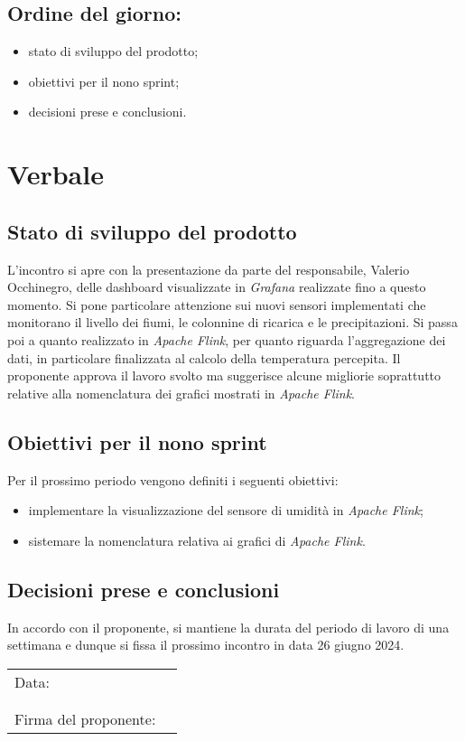 \documentclass[italian,12pt]{article}
\begin{document}
\subsection*{Ordine del giorno:}
\begin{itemize}
	\item stato di sviluppo del prodotto;
	\item obiettivi per il nono sprint;
	\item decisioni prese e conclusioni.
\end{itemize}

\newpage

\section{Verbale}

\subsection{Stato di sviluppo del prodotto}
L'incontro si apre con la presentazione da parte del responsabile, Valerio Occhinegro, delle dashboard visualizzate in \textit{Grafana} realizzate fino a questo momento. Si pone particolare attenzione sui nuovi sensori implementati che monitorano il livello dei fiumi, le colonnine di ricarica e le precipitazioni. Si passa poi a quanto realizzato in \textit{Apache Flink}, per quanto riguarda l'aggregazione dei dati, in particolare finalizzata al calcolo della temperatura percepita. Il proponente approva il lavoro svolto ma suggerisce alcune migliorie soprattutto relative alla nomenclatura dei grafici mostrati in \textit{Apache Flink}.

\subsection{Obiettivi per il nono sprint}
Per il prossimo periodo vengono definiti i seguenti obiettivi:
\begin{itemize}
	\item implementare la visualizzazione del sensore di umidità in \textit{Apache Flink};
	\item sistemare la nomenclatura relativa ai grafici di \textit{Apache Flink}.
\end{itemize}

\subsection{Decisioni prese e conclusioni}
In accordo con il proponente, si mantiene la durata del periodo di lavoro di una settimana e dunque si fissa il prossimo incontro in data
26 giugno 2024.

\begin{table}[b]
	\begin{tabular}{@{}p{5cm}p{10cm}@{}}
		Data:                 & \hrulefill \\
		                      &            \\
		                      &            \\
		Firma del proponente: & \hrulefill \\
	\end{tabular}
\end{table}
\end{document}
